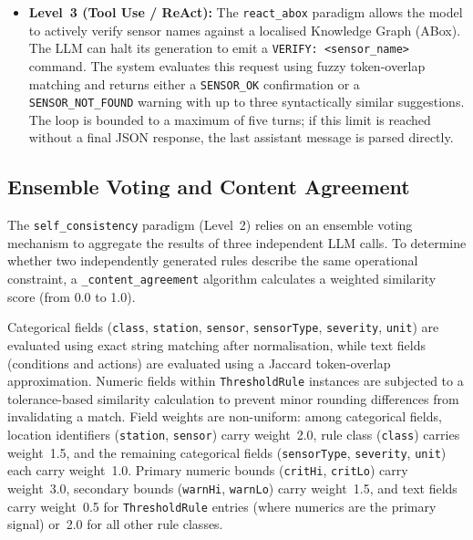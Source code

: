﻿\documentclass[11pt]{article}
\begin{document}
\begin{itemize}
          The \texttt{reflexion\_guided} paradigm extends this to three turns,
          adding a rigid domain-specific checklist in the final turn that covers
          six categories: (1)~completeness across all stations, (2)~cross-station
          dependencies, (3)~temporal anomaly patterns (SPIKE, DRIFT, STUCK,
          OUT\_OF\_RANGE, CORRELATED), (4)~predictive and corrective maintenance
          protocols (MAINT-01 to MAINT-08), (5)~access-control and zone-occupancy
          rules, and (6)~correctness of all numeric threshold values.
    \item \textbf{Level~3 (Tool Use / ReAct):} The \texttt{react\_abox} paradigm
          allows the model to actively verify sensor names against a localised
          Knowledge Graph (ABox). The LLM can halt its generation to emit a
          \texttt{VERIFY: <sensor\_name>} command. The system evaluates this request
          using fuzzy token-overlap matching and returns either a \texttt{SENSOR\_OK}
          confirmation or a \texttt{SENSOR\_NOT\_FOUND} warning with up to three
          syntactically similar suggestions. The loop is bounded to a maximum of
          five turns; if this limit is reached without a final JSON response, the
          last assistant message is parsed directly.
\end{itemize}

\subsection{Ensemble Voting and Content Agreement}
\label{sec:ensemble}
The \texttt{self\_consistency} paradigm (Level~2) relies on an ensemble voting
mechanism to aggregate the results of three independent LLM calls. To determine
whether two independently generated rules describe the same operational constraint,
a \texttt{\_content\_agreement} algorithm calculates a weighted similarity score
(from 0.0 to 1.0).

Categorical fields (\texttt{class}, \texttt{station}, \texttt{sensor},
\texttt{sensorType}, \texttt{severity}, \texttt{unit}) are evaluated using exact
string matching after normalisation, while text fields (conditions and actions) are
evaluated using a Jaccard token-overlap approximation. Numeric fields within
\texttt{ThresholdRule} instances are subjected to a tolerance-based similarity
calculation to prevent minor rounding differences from invalidating a match. Field weights are non-uniform: among categorical fields, location identifiers
(\texttt{station}, \texttt{sensor}) carry weight~2.0, rule class
(\texttt{class}) carries weight~1.5, and the remaining categorical fields
(\texttt{sensorType}, \texttt{severity}, \texttt{unit}) each carry weight~1.0.
Primary numeric bounds (\texttt{critHi}, \texttt{critLo}) carry weight~3.0,
secondary bounds (\texttt{warnHi}, \texttt{warnLo}) carry weight~1.5, and text
fields carry weight~0.5 for \texttt{ThresholdRule} entries (where numerics are
the primary signal) or~2.0 for all other rule classes.
\end{document}
